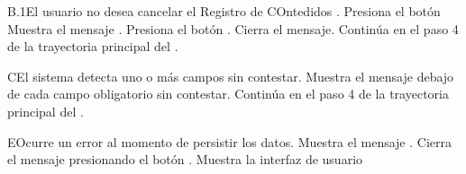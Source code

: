 \begin{UCtrayectoriaA}{B.1}{El usuario no desea cancelar el Registro de COntedidos .}
	\UCpaso[\UCactor] Presiona el botón 
	\UCpaso Muestra el mensaje .
	\UCpaso[\UCactor] Presiona el botón .
	\UCpaso Cierra el mensaje.
	\UCpaso Continúa en el paso 4 de la trayectoria principal del .
\end{UCtrayectoriaA}

\begin{UCtrayectoriaA}{C}{El sistema detecta uno o más campos sin contestar.}
	\UCpaso Muestra el mensaje  debajo de cada campo obligatorio sin contestar.
	\UCpaso Continúa en el paso 4 de la trayectoria principal del .
\end{UCtrayectoriaA}

\begin{UCtrayectoriaA}{E}{Ocurre un error al momento de persistir los datos.}
	\UCpaso Muestra el mensaje .
	\UCpaso[\UCactor] Cierra el mensaje presionando el botón .
	\UCpaso Muestra la interfaz de usuario 
\end{UCtrayectoriaA}

